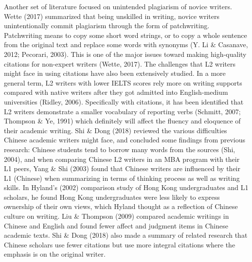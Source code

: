 Another set of literature focused on unintended plagiarism of novice writers. Wette (2017) summarized that being unskilled in writing, novice writers unintentionally commit plagiarism through the form of patchwriting. Patchwriting means to copy some short word strings, or to copy a whole sentence from the original text and replace some words with synonyms (Y. Li \& Casanave, 2012; Pecorari, 2003). This is one of the major issues toward making high-quality citations for non-expert writers (Wette, 2017).
The challenges that L2 writers might face in using citations have also been extensively studied. In a more general term, L2 writers with lower IELTS scores rely more on writing supports compared with native writers after they got admitted into English-medium universities (Ridley, 2006). Specifically with citations, it has been identified that L2 writers demonstrate a smaller vocabulary of reporting verbs (Schmitt, 2007; Thompson \& Ye, 1991) which definitely will affect the fluency and eloquence of their academic writing. Shi \& Dong (2018) reviewed the various difficulties Chinese academic writers might face, and concluded some findings from previous research: Chinese students tend to borrow many words from the sources (Shi, 2004), and when comparing Chinese L2 writers in an MBA program with their L1 peers, Yang \& Shi (2003) found that Chinese writers are influenced by their L1 (Chinese) when summarizing in terms of thinking process as well as writing skills. In Hyland’s (2002) comparison study of Hong Kong undergraduates and L1 scholars, he found Hong Kong undergraduates were less likely to express ownership of their own views, which Hyland thought as a reflection of Chinese culture on writing. Liu \& Thompson (2009) compared academic writings in Chinese and English and found fewer affect and judgment items in Chinese academic texts. Shi \& Dong (2018) also made a summary of related research that Chinese scholars use fewer citations but use more integral citations where the emphasis is on the original writer.